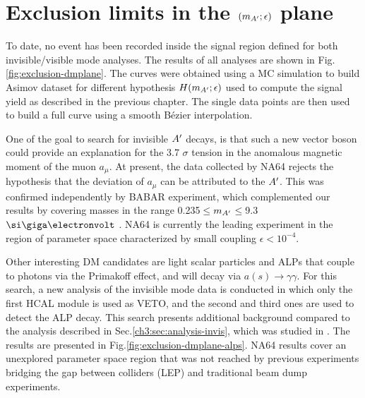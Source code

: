 
\section{Exclusion limits in the $(m_{A'};\epsilon)$ plane}
\label{ch4:sec:exclusion-limits}

To date, no event has been recorded inside the signal region defined for both invisible/visible mode analyses. The results of all analyses are shown in Fig.\ref{fig:exclusion-dmplane}. The curves were obtained using a MC simulation to build Asimov dataset for different hypothesis $H(m_{A'};\epsilon)$ used to compute the signal yield as described in the previous chapter. The single data points are then used to build a full curve using a smooth Bézier interpolation.

One of the goal to search for invisible $A'$ decays, is that such a new vector boson could provide an explanation for the 3.7 $\sigma$ tension in the anomalous magnetic moment of the muon $a_{\mu}$. At present, the data collected by NA64 rejects the hypothesis that the deviation of $a_{\mu}$ can be attributed to the $A'$. This was confirmed independently by BABAR experiment, which complemented our results by covering masses in the range 0.235$\leq$$m_{A'}$$\leq$9.3 $\gev$ \cite{PhysRevLett.119.131804}. NA64 is currently the leading experiment in the region of parameter space characterized by small coupling $\epsilon < 10^{-4}$.

Other interesting DM candidates are light scalar particles and ALPs that couple to photons via the Primakoff effect, and will decay via $a(s) \to \gamma \gamma$. For this search, a new analysis of the invisible mode data is conducted in which only the first HCAL module is used as VETO, and the second and third ones are used to detect the ALP decay. This search presents additional background compared to the analysis described in Sec.\ref{ch3:sec:analysis-invis}, which was studied in \cite{Banerjee:2020fue}. The results are presented in Fig.\ref{fig:exclusion-dmplane-alps}. NA64 results cover an unexplored parameter space region that was not reached by previous experiments bridging the gap between colliders (LEP) and traditional beam dump experiments.

